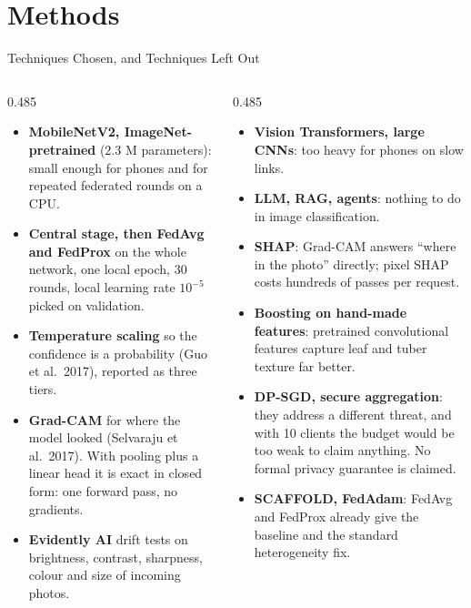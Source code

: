 \documentclass[11pt, aspectratio=169]{beamer}
\begin{document}
\section{Methods}
\begin{frame}[t]{Techniques Chosen, and Techniques Left Out}
  \body
  \begin{columns}[T]
    \begin{column}{0.485\textwidth}
      \par\vspace{0.25em}
      \begin{itemize}\setlength\itemsep{0.2em}
        \item \textbf{MobileNetV2, ImageNet-pretrained} (2.3 M parameters): small enough for phones and for repeated federated rounds on a CPU.
        \item \textbf{Central stage, then FedAvg and FedProx} on the whole network, one local epoch, 30 rounds, local learning rate $10^{-5}$ picked on validation.
        \item \textbf{Temperature scaling} so the confidence is a probability (Guo et al.\ 2017), reported as three tiers.
        \item \textbf{Grad-CAM} for where the model looked (Selvaraju et al.\ 2017). With pooling plus a linear head it is exact in closed form: one forward pass, no gradients.
        \item \textbf{Evidently AI} drift tests on brightness, contrast, sharpness, colour and size of incoming photos.
      \end{itemize}
    \end{column}
    \begin{column}{0.485\textwidth}
      \par\vspace{0.25em}
      \begin{itemize}\setlength\itemsep{0.2em}
        \item \textbf{Vision Transformers, large CNNs}: too heavy for phones on slow links.
        \item \textbf{LLM, RAG, agents}: nothing to do in image classification.
        \item \textbf{SHAP}: Grad-CAM answers ``where in the photo'' directly; pixel SHAP costs hundreds of passes per request.
        \item \textbf{Boosting on hand-made features}: pretrained convolutional features capture leaf and tuber texture far better.
        \item \textbf{DP-SGD, secure aggregation}: they address a different threat, and with 10 clients the budget would be too weak to claim anything. No formal privacy guarantee is claimed.
        \item \textbf{SCAFFOLD, FedAdam}: FedAvg and FedProx already give the baseline and the standard heterogeneity fix.
      \end{itemize}
    \end{column}
  \end{columns}
\end{frame}
\end{document}
